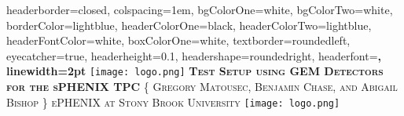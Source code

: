 \documentclass[landscape,a0paper,fontscale=0.285]{baposter} %
\begin{document}
\begin{poster}
{
headerborder=closed, %
colspacing=1em, %
bgColorOne=white, %
bgColorTwo=white, %
borderColor=lightblue, %
headerColorOne=black, %
headerColorTwo=lightblue, %
headerFontColor=white, %
boxColorOne=white, %
textborder=roundedleft, %
eyecatcher=true, %
headerheight=0.1\textheight, %
headershape=roundedright, %
headerfont=\Large\bf\textsc, %
linewidth=2pt %
}
%
{\texttt{[image: logo.png]}} %
{\bf\textsc{Test Setup using GEM Detectors for the sPHENIX TPC}\vspace{0.5em}} %
{\textsc{\{ Gregory Matousec, Benjamin Chase, and Abigail Bishop \} \hspace{12pt} ePHENIX at Stony Brook University}} %
{\texttt{[image: logo.png]}} %





\end{poster}
\end{document}
